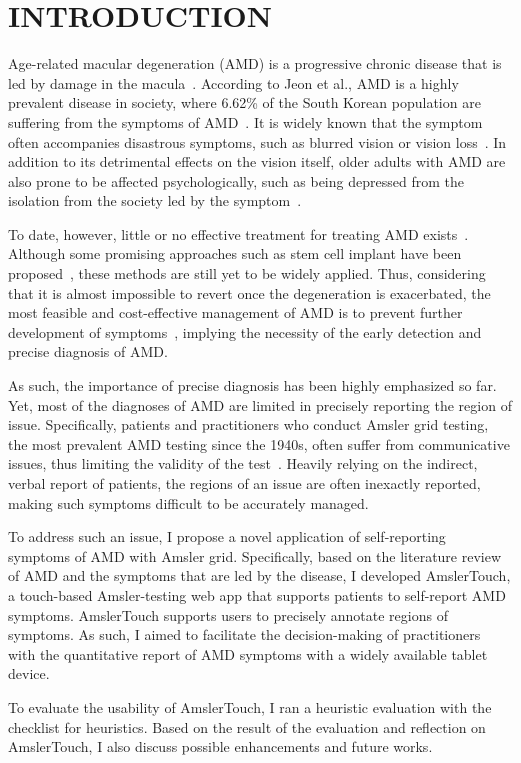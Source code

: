 \chapter{INTRODUCTION}

Age-related macular degeneration (AMD) is a progressive chronic disease that is led by damage in the macula~\cite{lim2012age}. According to Jeon et al., AMD is a highly prevalent disease in society, where 6.62\% of the South Korean population are suffering from the symptoms of AMD~\cite{park2014age}. It is widely known that the symptom often accompanies disastrous symptoms, such as blurred vision or vision loss~\cite{lim2012age}. In addition to its detrimental effects on the vision itself, older adults with AMD are also prone to be affected psychologically, such as being depressed from the isolation from the society led by the symptom~\cite{rovner2007preventing}.

To date, however, little or no effective treatment for treating AMD exists~\cite{wong2011prevention}. Although some promising approaches such as stem cell implant have been proposed~\cite{carr2013development}, these methods are still yet to be widely applied. Thus, considering that it is almost impossible to revert once the degeneration is exacerbated, the most feasible and cost-effective management of AMD is to prevent further development of symptoms~\cite{al2017recent}, implying the necessity of the early detection and precise diagnosis of AMD.

As such, the importance of precise diagnosis has been highly emphasized so far. Yet, most of the diagnoses of AMD are limited in precisely reporting the region of issue. Specifically, patients and practitioners who conduct Amsler grid testing, the most prevalent AMD testing since the 1940s, often suffer from communicative issues, thus limiting the validity of the test~\cite{schuchard1993validity}. Heavily relying on the indirect, verbal report of patients, the regions of an issue are often inexactly reported, making such symptoms difficult to be accurately managed.

To address such an issue, I propose a novel application of self-reporting symptoms of AMD with Amsler grid. Specifically, based on the literature review of AMD and the symptoms that are led by the disease, I developed AmslerTouch, a touch-based Amsler-testing web app that supports patients to self-report AMD symptoms. AmslerTouch supports users to precisely annotate regions of symptoms. As such, I aimed to facilitate the decision-making of practitioners with the quantitative report of AMD symptoms with a widely available tablet device.

To evaluate the usability of AmslerTouch, I ran a heuristic evaluation with the checklist for heuristics. Based on the result of the evaluation and reflection on AmslerTouch, I also discuss possible enhancements and future works.
